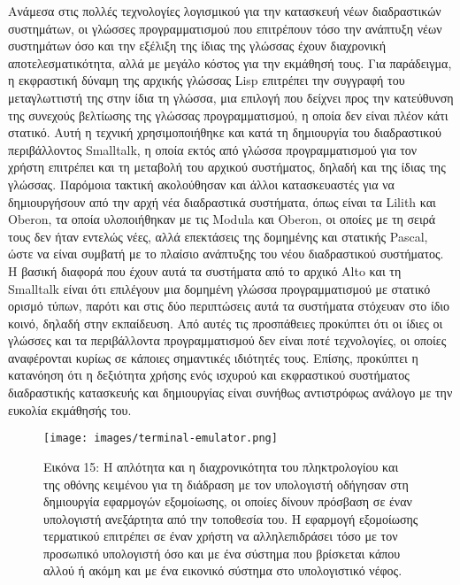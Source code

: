 \documentclass[
]{article}
\begin{document}
Ανάμεσα στις πολλές τεχνολογίες λογισμικού για την κατασκευή νέων
διαδραστικών συστημάτων, οι γλώσσες προγραμματισμού που επιτρέπουν τόσο
την ανάπτυξη νέων συστημάτων όσο και την εξέλιξη της ίδιας της γλώσσας
έχουν διαχρονική αποτελεσματικότητα, αλλά με μεγάλο κόστος για την
εκμάθησή τους. Για παράδειγμα, η εκφραστική δύναμη της αρχικής γλώσσας
Lisp επιτρέπει την συγγραφή του μεταγλωττιστή της στην ίδια τη γλώσσα,
μια επιλογή που δείχνει προς την κατεύθυνση της συνεχούς βελτίωσης της
γλώσσας προγραμματισμού, η οποία δεν είναι πλέον κάτι στατικό. Αυτή η
τεχνική χρησιμοποιήθηκε και κατά τη δημιουργία του διαδραστικού
περιβάλλοντος Smalltalk, η οποία εκτός από γλώσσα προγραμματισμού για
τον χρήστη επιτρέπει και τη μεταβολή του αρχικού συστήματος, δηλαδή και
της ίδιας της γλώσσας. Παρόμοια τακτική ακολούθησαν και άλλοι
κατασκευαστές για να δημιουργήσουν από την αρχή νέα διαδραστικά
συστήματα, όπως είναι τα Lilith και Oberon, τα οποία υλοποιήθηκαν με τις
Modula και Oberon, οι οποίες με τη σειρά τους δεν ήταν εντελώς νέες,
αλλά επεκτάσεις της δομημένης και στατικής Pascal, ώστε να είναι συμβατή
με το πλαίσιο ανάπτυξης του νέου διαδραστικού συστήματος. Η βασική
διαφορά που έχουν αυτά τα συστήματα από το αρχικό Alto και τη Smalltalk
είναι ότι επιλέγουν μια δομημένη γλώσσα προγραμματισμού με στατικό
ορισμό τύπων, παρότι και στις δύο περιπτώσεις αυτά τα συστήματα στόχευαν
στο ίδιο κοινό, δηλαδή στην εκπαίδευση. Από αυτές τις προσπάθειες
προκύπτει ότι οι ίδιες οι γλώσσες και τα περιβάλλοντα προγραμματισμού
δεν είναι ποτέ τεχνολογίες, οι οποίες αναφέρονται κυρίως σε κάποιες
σημαντικές ιδιότητές τους. Επίσης, προκύπτει η κατανόηση ότι η δεξιότητα
χρήσης ενός ισχυρού και εκφραστικού συστήματος διαδραστικής κατασκευής
και δημιουργίας είναι συνήθως αντιστρόφως ανάλογο με την ευκολία
εκμάθησής του.

\leavevmode{}%
\begin{figure}
\hypertarget{fig:terminal-emulator}{%
\centering
\texttt{[image: images/terminal-emulator.png]}
\caption{Εικόνα 15: Η απλότητα και η διαχρονικότητα του πληκτρολογίου
και της οθόνης κειμένου για τη διάδραση με τον υπολογιστή οδήγησαν στη
δημιουργία εφαρμογών εξομοίωσης, οι οποίες δίνουν πρόσβαση σε έναν
υπολογιστή ανεξάρτητα από την τοποθεσία του. Η εφαρμογή εξομοίωσης
τερματικού επιτρέπει σε έναν χρήστη να αλληλεπιδράσει τόσο με τον
προσωπικό υπολογιστή όσο και με ένα σύστημα που βρίσκεται κάπου αλλού ή
ακόμη και με ένα εικονικό σύστημα στο υπολογιστικό
νέφος.}\label{fig:terminal-emulator}
}
\end{figure}
\end{document}
